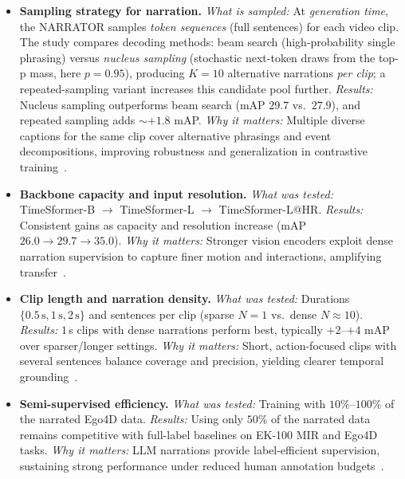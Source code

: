 \begin{enrichment}
\begin{enrichment}
\begin{itemize}
            \item \textbf{Sampling strategy for narration.} \emph{What is sampled:} At \emph{generation time}, the NARRATOR samples \emph{token sequences} (full sentences) for each video clip. The study compares decoding methods: beam search (high\mbox{-}probability single phrasing) versus \emph{nucleus sampling} (stochastic next\mbox{-}token draws from the top\mbox{-}p mass, here $p{=}0.95$), producing $K{=}10$ alternative narrations \emph{per clip}; a repeated\mbox{-}sampling variant increases this candidate pool further. \emph{Results:} Nucleus sampling outperforms beam search (mAP $29.7$ vs.\ $27.9$), and repeated sampling adds $\sim{+}1.8$ mAP. \emph{Why it matters:} Multiple diverse captions for the same clip cover alternative phrasings and event decompositions, improving robustness and generalization in contrastive training~\cite{zhao2022_lavila}.
            
            \item \textbf{Backbone capacity and input resolution.} \emph{What was tested:} TimeSformer\mbox{-}B $\rightarrow$ TimeSformer\mbox{-}L $\rightarrow$ TimeSformer\mbox{-}L@HR. \emph{Results:} Consistent gains as capacity and resolution increase (mAP $26.0 \rightarrow 29.7 \rightarrow 35.0$). \emph{Why it matters:} Stronger vision encoders exploit dense narration supervision to capture finer motion and interactions, amplifying transfer~\cite{zhao2022_lavila}.
            
            \item \textbf{Clip length and narration density.} \emph{What was tested:} Durations $\{0.5\,\mathrm{s},1\,\mathrm{s},2\,\mathrm{s}\}$ and sentences per clip (sparse $N{=}1$ vs.\ dense $N{\approx}10$). \emph{Results:} $1$\,s clips with dense narrations perform best, typically ${+}2$--${+}4$ mAP over sparser/longer settings. \emph{Why it matters:} Short, action\mbox{-}focused clips with several sentences balance coverage and precision, yielding clearer temporal grounding~\cite{zhao2022_lavila}.
            
            \item \textbf{Semi\mbox{-}supervised efficiency.} \emph{What was tested:} Training with $10\%$--$100\%$ of the narrated Ego4D data. \emph{Results:} Using only $50\%$ of the narrated data remains competitive with full\mbox{-}label baselines on EK\mbox{-}100 MIR and Ego4D tasks. \emph{Why it matters:} LLM narrations provide label\mbox{-}efficient supervision, sustaining strong performance under reduced human annotation budgets~\cite{zhao2022_lavila}.
            

\end{itemize}
\end{enrichment}
\end{enrichment}
